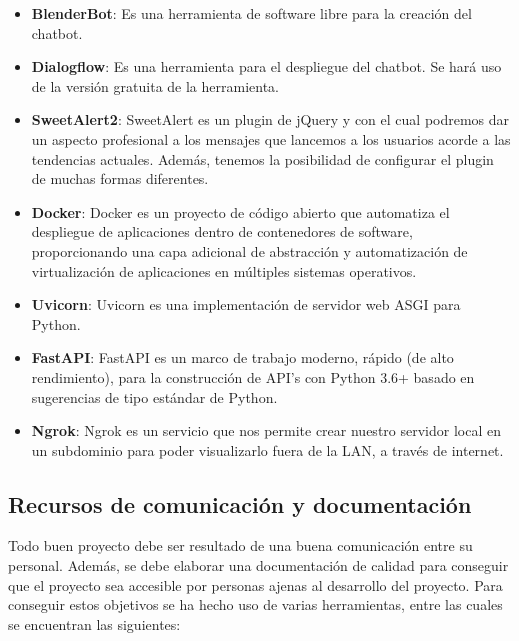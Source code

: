 \begin{itemize}
\item \textbf{BlenderBot}: Es una herramienta de software libre para la creación del chatbot.
\item \textbf{Dialogflow}: Es una herramienta para el despliegue del chatbot. Se hará uso de la versión gratuita de la herramienta.
\item \textbf{SweetAlert2}: SweetAlert es un plugin de jQuery y con el cual podremos dar un aspecto profesional a los mensajes que lancemos a los usuarios acorde a las tendencias actuales. Además, tenemos la posibilidad de configurar el plugin de muchas formas diferentes.
\item \textbf{Docker}: Docker es un proyecto de código abierto que automatiza el despliegue de aplicaciones dentro de contenedores de software, proporcionando una capa adicional de abstracción y automatización de virtualización de aplicaciones en múltiples sistemas operativos.
\item \textbf{Uvicorn}: Uvicorn es una implementación de servidor web ASGI para Python.
\item \textbf{FastAPI}: FastAPI es un marco de trabajo moderno, rápido (de alto rendimiento), para la construcción de API's con Python 3.6+ basado en sugerencias de tipo estándar de Python.
\item \textbf{Ngrok}: Ngrok es un servicio que nos permite crear nuestro servidor local en un subdominio para poder visualizarlo fuera de la LAN, a través de internet.
\end{itemize}

\subsection{Recursos de comunicación y documentación} \label{subsec:recur_comu_docu}

Todo buen proyecto debe ser resultado de una buena comunicación entre su personal. Además, se debe elaborar una documentación de calidad para conseguir que el proyecto sea accesible por personas ajenas al desarrollo del proyecto. Para conseguir estos objetivos se ha hecho uso de varias herramientas, entre las cuales se encuentran las siguientes:

